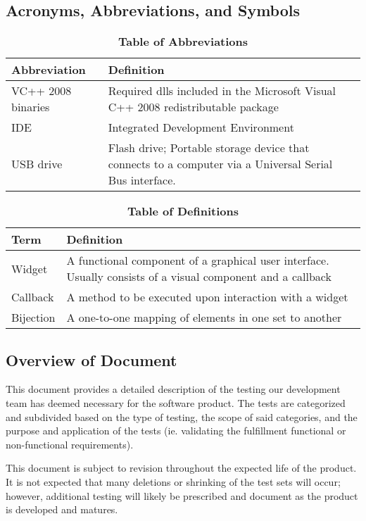 \documentclass[12pt, titlepage]{article}
\begin{document}
	\subsection{Acronyms, Abbreviations, and Symbols}
	
	\begin{table}[hbp]
		\caption{\textbf{Table of Abbreviations}} \label{AbbrTable}
		\begin{tabularx}{\textwidth}{p{3cm}X}
			\toprule
			\textbf{Abbreviation} & \textbf{Definition} \\
			\midrule
			VC++ 2008 \newline binaries & Required dlls included in the
			Microsoft Visual C++ 2008 redistributable package\\
			IDE & Integrated Development Environment\\
			USB drive & Flash drive; Portable storage device that connects to a 
			computer via a Universal Serial Bus interface.\\
			\bottomrule
		\end{tabularx}
	\end{table}
	\begin{table}[!htbp]
		\caption{\textbf{Table of Definitions}} \label{DefTable}
		\begin{tabularx}{\textwidth}{p{3cm}X}
			\toprule
			\textbf{Term} & \textbf{Definition}\\
			\midrule
			Widget & A functional component of a graphical user interface. 
			Usually	consists of a visual component and a callback\\
			Callback & A method to be executed upon interaction with a widget\\
			Bijection & A one-to-one mapping of elements in one set to another\\
			\bottomrule
		\end{tabularx}
	\end{table}	
	\subsection{Overview of Document}
	\indent \indent This document provides a detailed description of the 
	testing our development team has deemed necessary for the software product. 
	The tests are categorized and subdivided based on the type of testing, the 
	scope of said categories, and the purpose and application of the tests (ie. 
	validating the fulfillment functional or non-functional requirements).\par
	This document is subject to revision throughout the expected life of the 
	product. It is not expected that many deletions or shrinking of the test 
	sets will occur; however, additional testing will likely be prescribed and 
	document as the product is developed and matures.
	
\end{document}
